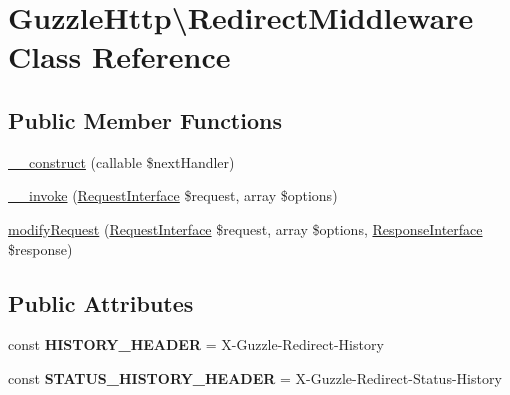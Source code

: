 \hypertarget{classGuzzleHttp_1_1RedirectMiddleware}{}\section{Guzzle\+Http\textbackslash{}Redirect\+Middleware Class Reference}
\label{classGuzzleHttp_1_1RedirectMiddleware}
\subsection*{Public Member Functions}
\begin{DoxyCompactItemize}
\item 
\hyperlink{classGuzzleHttp_1_1RedirectMiddleware_a4ee9dcdc33181a39a8abd9ef09b595cf}{\+\_\+\+\_\+construct} (callable \$next\+Handler)
\item 
\hyperlink{classGuzzleHttp_1_1RedirectMiddleware_a48bae420b672649ad449d61dfb70cc70}{\+\_\+\+\_\+invoke} (\hyperlink{interfacePsr_1_1Http_1_1Message_1_1RequestInterface}{Request\+Interface} \$request, array \$options)
\item 
\hyperlink{classGuzzleHttp_1_1RedirectMiddleware_a514ffae64d75e8e20e1dba10a54a4720}{modify\+Request} (\hyperlink{interfacePsr_1_1Http_1_1Message_1_1RequestInterface}{Request\+Interface} \$request, array \$options, \hyperlink{interfacePsr_1_1Http_1_1Message_1_1ResponseInterface}{Response\+Interface} \$response)
\end{DoxyCompactItemize}
\subsection*{Public Attributes}
\begin{DoxyCompactItemize}
\item 
\mbox{\label{classGuzzleHttp_1_1RedirectMiddleware_aac96a1350899ddd1169d8234b4451029}} 
const {\bfseries H\+I\+S\+T\+O\+R\+Y\+\_\+\+H\+E\+A\+D\+ER} = \textquotesingle{}X-\/Guzzle-\/Redirect-\/History\textquotesingle{}
\item 
\mbox{\label{classGuzzleHttp_1_1RedirectMiddleware_a9e91ecf2a14e2ed2dd9cc6142e08b721}} 
const {\bfseries S\+T\+A\+T\+U\+S\+\_\+\+H\+I\+S\+T\+O\+R\+Y\+\_\+\+H\+E\+A\+D\+ER} = \textquotesingle{}X-\/Guzzle-\/Redirect-\/Status-\/History\textquotesingle{}
\end{DoxyCompactItemize}
